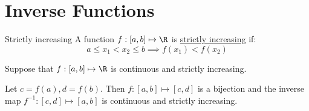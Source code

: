 \documentclass[../Main.tex]{subfiles}
\begin{document}
\section{Inverse Functions}
\begin{definition}{Strictly increasing}
    A function $f : [a, b] \mapsto \R$ is \underline{strictly increasing} if:
    \begin{equation*}
        a \leq x_1 < x_2 \leq b \implies f(x_1) < f(x_2)
    \end{equation*}
\end{definition}
\begin{theorem}
    Suppose that $f : [a, b] \mapsto \R$ is continuous and strictly increasing.\par
    Let $c = f(a), d = f(b)$. Then $f : [a, b] \mapsto [c, d]$ is a bijection and the inverse map $f^{-1} : [c, d] \mapsto [a, b]$ is continuous and strictly increasing.
    \label{thmInverseFunctionI}
\end{theorem}
\end{document}
